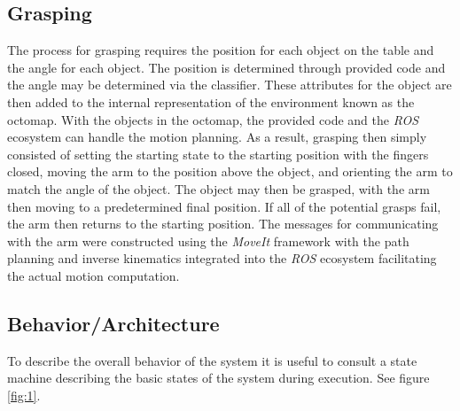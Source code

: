 \documentclass[letterpaper, 10 pt, conference]{conf/ieeeconf}  %
\begin{document}
\subsection{Grasping} %
The process for grasping requires the position for each object on the table and
the angle for each object. The position is determined through provided code and
the angle may be determined via the classifier. These attributes for the object
are then added to the internal representation of the environment known as the
octomap. With the objects in the octomap, the provided code and the \textit{ROS}
ecosystem can handle the motion planning. As a result, grasping then simply
consisted of setting the starting state to the starting position with the
fingers closed, moving the arm to the position above the object, and orienting
the arm to match the angle of the object. The object may then be grasped, with
the arm then moving to a predetermined final position. If all of the potential
grasps fail, the arm then returns to the starting position. The messages for
communicating with the arm were constructed using the \textit{MoveIt} framework
with the path planning and inverse kinematics integrated into the \textit{ROS}
ecosystem facilitating the actual motion computation.

\subsection{Behavior/Architecture} %
To describe the overall behavior of the system it is useful to consult a state
machine describing the basic states of the system during execution. See figure \ref{fig:1}.
\end{document}
